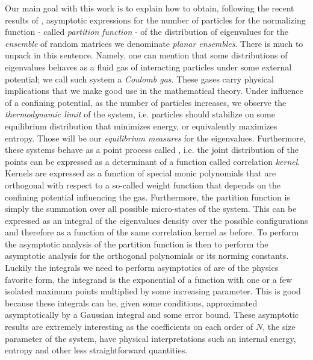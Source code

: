Our main goal with this work is to explain how to obtain, following the recent results of , asymptotic expressions for the number of particles for the normalizing function - called \textit{partition function} - of the distribution of eigenvalues for the \textit{ensemble} of random matrices we denominate \textit{planar ensembles}. There is much to unpack in this sentence. Namely, one can mention that some distributions of eigenvalues behaves as a fluid gas of interacting particles under some external potential; we call such system a \textit{Coulomb gas}. These gases carry physical implications that we make good use in the mathematical theory. Under influence of a confining potential, as the number of particles increases, we observe the \textit{thermodynamic limit} of the system, i.e. particles should stabilize on some equilibrium distribution that minimizes energy, or equivalently maximizes entropy. Those will be our \textit{equilibrium measures} for the eigenvalues. Furthermore, these systems behave as a point process called , i.e. the joint distribution of the points can be expressed as a determinant of a function called correlation \textit{kernel}. Kernels are expressed as a function of special monic polynomials that are orthogonal with respect to a so-called weight function that depends on the confining potential influencing the gas. Furthermore, the partition function is simply the summation over all possible micro-states of the system. This can be expressed as an integral of the eigenvalues density over the possible configurations and therefore as a function of the same correlation kernel as before. To perform the asymptotic analysis of the partition function is then to perform the asymptotic analysis for the orthogonal polynomials or its norming constants. Luckily the integrals we need to perform asymptotics of are of the physics favorite form, the integrand is the exponential of a function with one or a few isolated maximum points multiplied by some increasing parameter. This is good because these integrals can be, given some conditions, approximated asymptotically by a Gaussian integral and some error bound. These asymptotic results are extremely interesting as the coefficients on each order of $N$, the size parameter of the system, have physical interpretations such an internal energy, entropy and other less straightforward quantities. 

